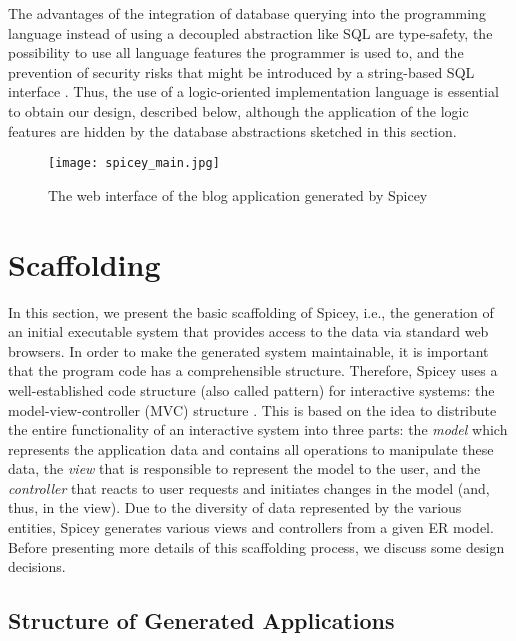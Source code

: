 \documentclass{tlp}
\begin{document}
The advantages of the integration of database querying
into the programming language instead of using a decoupled
abstraction like SQL are type-safety, the possibility to use all
language features the programmer is used to, and the prevention
of security risks that might be introduced by
a string-based SQL interface \cite{Huseby03}.
Thus, the use of a logic-oriented implementation language
is essential to obtain our design, described below,
although the application of the logic features
are hidden by the database abstractions sketched in this section.



\begin{figure}[t]
\begin{center}
  \texttt{[image: spicey\_main.jpg]}
\end{center}\vspace{-3ex}
\caption{The web interface of the blog application generated by Spicey}
\label{fig:spiceymain}
\end{figure}

\section{Scaffolding}
\label{sec:scaff}

In this section, we present the basic scaffolding of Spicey,
i.e., the generation of an initial executable system
that provides access to the data via standard web browsers.
In order to make the generated system maintainable,
it is important that the program code has a comprehensible structure.
Therefore, Spicey uses a
well-established code structure (also called pattern) for interactive systems:
the model-view-controller (MVC) structure \cite{KrasnerPope88}.
This is based on the idea to distribute the entire
functionality of an interactive system into three parts:
the \emph{model} which represents
the application data and contains all operations to manipulate these data,
the \emph{view} that is responsible to represent the model to the user,
and the \emph{controller} that reacts to user requests
and initiates changes in the model (and, thus, in the view).
Due to the diversity of data represented by the various
entities, Spicey generates various views and controllers
from a given ER model.
Before presenting more details of this scaffolding process,
we discuss some design decisions.


\subsection{Structure of Generated Applications}
\end{document}
